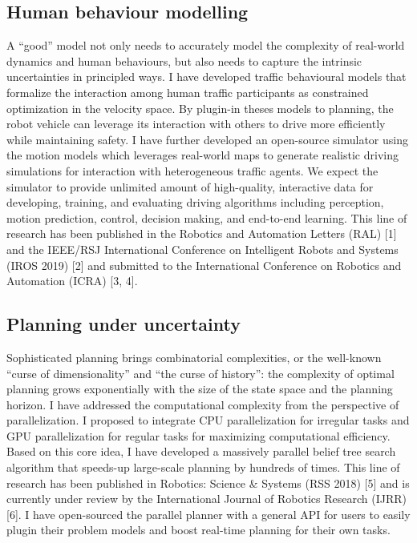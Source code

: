 \documentclass{article}
\begin{document}
\subsection*{Human behaviour modelling} 
A “good” model not only needs to accurately model the complexity of real-world dynamics and human behaviours, but also needs to capture the intrinsic uncertainties in principled ways. I have developed traffic behavioural models that formalize the interaction among human traffic participants as constrained optimization in the velocity space. By plugin-in theses models to planning, the robot vehicle can leverage its interaction with others to drive more efficiently while maintaining safety. I have further developed an open-source simulator using the motion models which leverages real-world maps to generate realistic driving simulations for interaction with heterogeneous traffic agents. We expect the simulator to provide unlimited amount of high-quality, interactive data for developing, training, and evaluating driving algorithms including perception, motion prediction, control, decision making, and end-to-end learning. This line of research has been published in the Robotics and Automation Letters (RAL) [1] and the IEEE/RSJ International Conference on Intelligent Robots and Systems (IROS 2019) [2] and submitted to the International Conference on Robotics and Automation (ICRA) [3, 4].

\subsection*{Planning under uncertainty} 
Sophisticated planning brings combinatorial complexities, or the well-known “curse of dimensionality” and “the curse of history”: the complexity of optimal planning grows exponentially with the size of the state space and the planning horizon. I have addressed the computational complexity from the perspective of parallelization. I proposed to integrate CPU parallelization for irregular tasks and GPU parallelization for regular tasks for maximizing computational efficiency. Based on this core idea, I have developed a massively parallel belief tree search algorithm that speeds-up large-scale planning by hundreds of times. This line of research has been published in Robotics: Science & Systems (RSS 2018) [5] and is currently under review by the International Journal of Robotics Research (IJRR) [6]. I have open-sourced the parallel planner with a general API for users to easily plugin their problem models and boost real-time planning for their own tasks.
\end{document}
